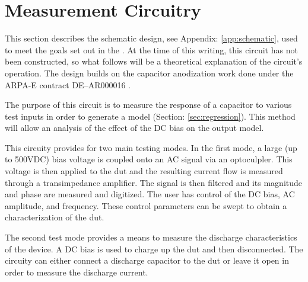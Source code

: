 \section {Measurement Circuitry}
\label{sec:measCirc}
This section describes the schematic design, see Appendix: \ref{app:schematic}, used to meet the goals set out in the . At the time of this writing, this circuit has not been constructed, so what follows will be a theoretical explanation of the circuit's operation. The design builds on the capacitor anodization work done under the ARPA-E contract DE--AR000016 \cite{steve_thesis}.

The purpose of this circuit is to measure the response of a capacitor to various test inputs in order to generate a model (Section: \ref{sec:regression}). This method will allow an analysis of the effect of the DC bias on the output model.

This circuity provides for two main testing modes. In the first mode, a large (up to 500VDC) bias voltage is coupled onto an AC signal via an optoculpler. This voltage is then applied to the \gls{dut} and the resulting current flow is measured through a transimpedance amplifier. The signal is then filtered and its magnitude and phase are measured and digitized. The user has control of the DC bias, AC amplitude, and frequency. These control parameters can be swept to obtain a characterization of the \gls{dut}.

The second test mode provides a means to measure the discharge characteristics of the device. A DC bias is used to charge up the \gls{dut} and then disconnected. The circuity can either connect a discharge capacitor to the \gls{dut} or leave it open in order to measure the discharge current.


\nocite{my_ieeePaper}













